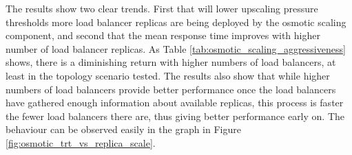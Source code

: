 The results show two clear trends.
First that will lower upscaling pressure thresholds more load balancer replicas are being deployed by the osmotic scaling component, and second that the mean response time improves with higher number of load balancer replicas.
As Table \ref{tab:osmotic_scaling_aggressiveness} shows, there is a diminishing return with higher numbers of load balancers, at least in the topology scenario tested.
The results also show that while higher numbers of load balancers provide better performance once the load balancers have gathered enough information about available replicas, this process is faster the fewer load balancers there are, thus giving better performance early on.
The behaviour can be observed easily in the graph in Figure \ref{fig:osmotic_trt_vs_replica_scale}.